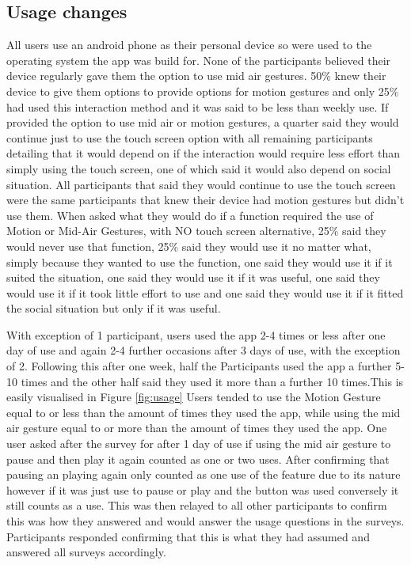 \documentclass{l4proj}
\begin{document}
\subsection{Usage changes}
All users use an android phone as their personal device so were used to the operating system the app was build for. None of the participants believed their device regularly gave them the option to use mid air gestures. 50\% knew their device to give them options to provide options for motion gestures and only 25\% had used this interaction method and it was said to be less than weekly use. If provided the option to use mid air or motion gestures, a quarter said they would continue just to use the touch screen option with all remaining participants detailing that it would depend on if the interaction would require less effort than simply using the touch screen, one of which said it would also depend on social situation. All participants that said they would continue to use the touch screen were the same participants that knew their device had motion gestures but didn't use them. When asked what they would do if a function required the use of Motion or Mid-Air Gestures, with NO touch screen alternative, 25\% said they would never use that function, 25\% said they would use it no matter what, simply because they wanted to use the function, one said they would use it if it suited the situation, one said they would use it if it was useful, one said they would use it if it took little effort to use and one said they would use it if it fitted the social situation but only if it was useful.

With exception of 1 participant, users  used the app 2-4 times or less after one day of use and again 2-4 further occasions after 3 days of use, with the exception of 2. Following this after one week, half the Participants used the app a further 5-10 times and the other half said they used it more than a further 10 times.This is easily visualised in Figure \ref{fig:usage} Users tended to use the Motion Gesture equal to or less than the amount of times they used the app, while using the mid air gesture equal to or more than the amount of times they used the app. One user asked after the survey for after 1 day of use if using the mid air gesture to pause and then play it again counted as one or two uses. After confirming that pausing an playing again only counted as one use of the feature due to its nature however if it was just use to pause or play and the button was used conversely it still counts as a use. This was then relayed to all other participants to confirm this was how they answered and would answer the usage questions in the surveys. Participants responded confirming that this is what they had assumed and answered all surveys accordingly.
\end{document}
